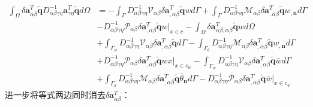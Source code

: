 \begin{equation}
\begin{split}
    \int_{\Omega}\delta\pmb{a}_{\alpha\beta}^T\tilde{\pmb{q}}D^{-1}_{\alpha\beta\gamma\eta}\pmb{a}_{\gamma\eta}^T\tilde{\pmb{q}}d\Omega&=
    -\int_{\Gamma}D_{\alpha\beta\gamma\eta}^{-1}\mathcal{V}_{\alpha\beta}\delta\pmb{a}_{,\alpha\beta}^T\tilde{\pmb{q}}wd\Gamma
    +\int_{\Gamma}D_{\alpha\beta\gamma\eta}^{-1}\mathcal{M}_{\alpha\beta}\delta\pmb{a}_{,\alpha\beta}^T\tilde{\pmb{q}}w_{,\pmb{n}}d\Gamma\\
    &-D_{\alpha\beta\gamma\eta}^{-1}\mathcal{P}_{\alpha\beta}\delta\pmb{a}_{,\alpha\beta}^T\tilde{\pmb{q}}w\vert_{x\in c}
    -\int_{\Omega}\delta\pmb{a}_{\alpha\beta,\alpha\beta}^T\tilde{\pmb{q}}wd\Omega\\
    &+\int_{\Gamma_w}D_{\alpha\beta\gamma\eta}^{-1}\mathcal{V}_{\alpha\beta}\delta\pmb{a}_{,\alpha\beta}^T\tilde{\pmb{q}}d\Gamma
    -\int_{\Gamma_{\theta}}D_{\alpha\beta\gamma\eta}^{-1}\mathcal{M}_{\alpha\beta}\delta\pmb{a}_{,\alpha\beta}^T\tilde{\pmb{q}}w_{,\pmb{n}}d\Gamma\\
    &+D_{\alpha\beta\gamma\eta}^{-1}\mathcal{P}_{\alpha\beta}\delta\pmb{a}_{,\alpha\beta}^T\tilde{\pmb{q}}wx\vert_{x\in{c_w}}
    -\int_{\Gamma_w}D_{\alpha\beta\gamma\eta}^{-1}\mathcal{V}_{\alpha\beta}\delta\pmb{a}_{,\alpha\beta}^T\tilde{\pmb{q}}\bar{w}d\Gamma\\
    &+\int_{\Gamma_{\theta}}D_{\alpha\beta\gamma\eta}^{-1}\mathcal{M}_{\alpha\beta}\delta\pmb{a}_{,\alpha\beta}^T\tilde{\pmb{q}}\bar{\theta}_{\pmb{n}}d\Gamma
    -D_{\alpha\beta\gamma\eta}^{-1}\mathcal{P}_{\alpha\beta}\delta\pmb{a}_{,\alpha\beta}^T\tilde{\pmb{q}}\bar{w}\vert_{x\in{c_w}}
\end{split}
\end{equation}
进一步将等式两边同时消去$\delta\pmb{a}^T_{\alpha\beta}$：

